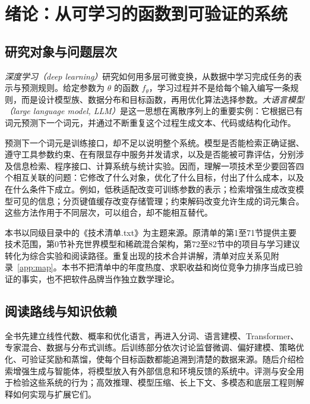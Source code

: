 \setcounter{chapter}{0} %
\chapter{绪论：从可学习的函数到可验证的系统}
\label{ch:introduction}

\section{研究对象与问题层次}

\emph{深度学习（deep learning）}研究如何用多层可微变换，从数据中学习完成任务的表示与预测规则。给定参数为 $\theta$ 的函数 $f_\theta$，学习过程并不是给每个输入编写一条规则，而是设计模型族、数据分布和目标函数，再用优化算法选择参数。\emph{大语言模型（large language model, LLM）}是这一思想在离散序列上的重要实例：它根据已有词元预测下一个词元，并通过不断重复这个过程生成文本、代码或结构化动作。

预测下一个词元是训练接口，却不足以说明整个系统。模型是否能检索正确证据、遵守工具参数约束、在有限显存中服务并发请求，以及是否能被可靠评估，分别涉及信息检索、程序接口、计算系统与统计实验。因而，理解一项技术至少要回答四个相互关联的问题：它修改了什么对象，优化了什么目标，付出了什么成本，以及在什么条件下成立。例如，低秩适配改变可训练参数的表示；检索增强生成改变模型可见的信息；分页键值缓存改变存储管理；约束解码改变允许生成的词元集合。这些方法作用于不同层次，可以组合，却不能相互替代。

本书以同级目录中的《技术清单.txt》为主题来源。原清单的第1至71节提供主要技术范围，第0节补充世界模型和稀疏混合架构，第72至82节中的项目与学习建议转化为综合实验和阅读路径。重复出现的技术合并讲解，清单对应关系见附录~\ref{app:map}。本书不把清单中的年度热度、求职收益和岗位竞争力排序当成已验证的事实，也不把软件品牌当作独立数学理论。

\section{阅读路线与知识依赖}

全书先建立线性代数、概率和优化语言，再进入分词、语言建模、Transformer、专家混合、数据与分布式训练。后训练部分依次讨论监督微调、偏好建模、策略优化、可验证奖励和蒸馏，使每个目标函数都能追溯到清楚的数据来源。随后介绍检索增强生成与智能体，将模型放入有外部信息和环境反馈的系统中。评测与安全用于检验这些系统的行为；高效推理、模型压缩、长上下文、多模态和底层工程则解释如何实现与扩展它们。

